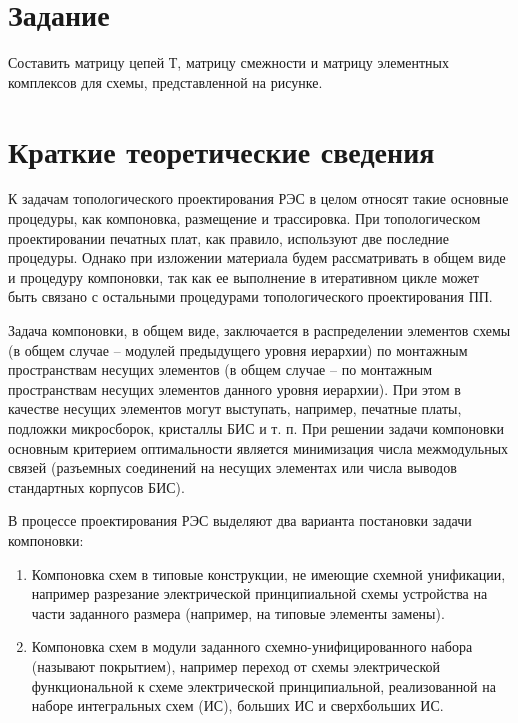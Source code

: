 \documentclass[a4paper,14pt]{article}
\begin{document}

\tableofcontents
\pagebreak

\section{Задание}

Составить матрицу цепей Т, матрицу смежности и матрицу элементных комплексов для схемы, представленной на рисунке.

\section{Краткие теоретические сведения}

К задачам	топологического проектирования РЭС в целом	относят	такие
основные  процедуры,  как  компоновка,   размещение   и	трассировка.	При
топологическом проектировании печатных	плат, как	правило,	используют  две
последние	процедуры. Однако при  изложении	материала будем	рассматривать
в  общем	виде	и   процедуру	компоновки,	так	как	ее		выполнение  в
итеративном	цикле	может	быть	связано	с	остальными	процедурами
топологического проектирования ПП.	
							
Задача	компоновки,	в	общем	виде,	заключается	в	распределении
элементов схемы	(в общем	случае – модулей	предыдущего  уровня  иерархии)
по  монтажным	пространствам	несущих	элементов  (в	общем	случае	–  по
монтажным	пространствам несущих  элементов данного уровня  иерархии). При
этом  в  качестве	несущих	элементов	могут	выступать,  например, печатные
платы, подложки	микросборок, кристаллы	БИС и т. п.  При	решении  задачи
компоновки	основным	критерием  оптимальности является минимизация	числа межмодульных связей (разъемных соединений на несущих элементах или числа выводов стандартных корпусов БИС).

В	процессе проектирования РЭС выделяют два варианта постановки задачи компоновки:

\begin{enumerate}
	\item Компоновка схем в типовые конструкции, не имеющие схемной унификации, например разрезание электрической принципиальной схемы устройства на части заданного размера (например, на типовые элементы замены).
	
	\item Компоновка схем в модули заданного схемно-унифицированного набора (называют покрытием), например переход от схемы электрической функциональной к схеме электрической принципиальной, реализованной на	наборе  интегральных  схем (ИС),  больших  ИС  и  сверхбольших ИС.

\end{enumerate}
\end{document}
